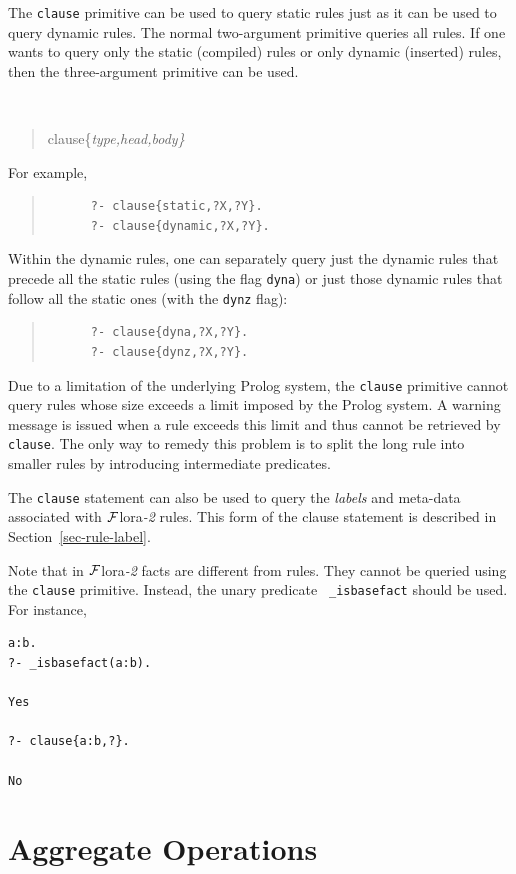 \documentclass[11pt]{article}
\newcommand{\FLORA}{{\mbox{\sc ${\cal F}${lora}\rm\emph{-2}}}\xspace}
\begin{document}
The {\tt clause} primitive can be used to query static rules just as it can
be used to query dynamic rules.
The normal two-argument primitive queries all rules. If one wants to query
only the static (compiled) rules or only dynamic (inserted) rules, then the
three-argument primitive can be used.
{\tt
\begin{quote}
clause\{\it{type,head,body}\}
\end{quote}
}
\noindent
For example,
\begin{quote}
\begin{verbatim}
      ?- clause{static,?X,?Y}.
      ?- clause{dynamic,?X,?Y}.
\end{verbatim}
\end{quote}
Within the dynamic rules, one can separately query just the dynamic rules
that precede all the static rules (using the flag {\tt dyna}) or just those
dynamic rules that follow all the static ones (with the {\tt dynz} flag):
\begin{quote}
\begin{verbatim}
      ?- clause{dyna,?X,?Y}.
      ?- clause{dynz,?X,?Y}.
\end{verbatim}
\end{quote}

Due to a limitation of the underlying Prolog system, the {\tt clause}
primitive cannot query rules whose size exceeds a limit imposed by the
Prolog system.  A warning message is issued when a rule exceeds this limit
and thus cannot be retrieved by {\tt clause}.  The only way to remedy this
problem is to split the long rule into smaller rules by introducing
intermediate predicates.

The {\tt clause} statement can also be used to query the \emph{labels} and
meta-data associated with \FLORA rules. This form of the clause statement
is described in Section~\ref{sec-rule-label}.

Note that in \FLORA facts are different from rules. They cannot be queried
using the {\tt clause} primitive. Instead, the unary predicate {\tt
  \_isbasefact} should be used. For instance,
\begin{verbatim}
a:b.
?- _isbasefact(a:b).

Yes

?- clause{a:b,?}.

No
\end{verbatim}


\section{Aggregate Operations}
\label{sec-aggregates}
\end{document}
